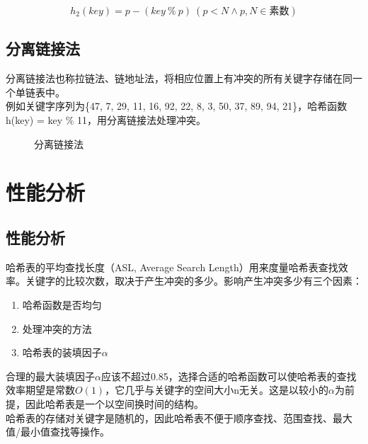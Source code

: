 \vspace{-0.5cm}

$$
	h_2(key) = p - (key\ \%\ p)\ \left(p < N \wedge p, N \in \text{素数}\right)
$$

\vspace{0.5cm}

\subsection{分离链接法}

分离链接法也称拉链法、链地址法，将相应位置上有冲突的所有关键字存储在同一个单链表中。\\

例如关键字序列为\{47, 7, 29, 11, 16, 92, 22, 8, 3, 50, 37, 89, 94, 21\}，哈希函数h(key) = key \% 11，用分离链接法处理冲突。

\begin{figure}[H]
	\centering
	\caption{分离链接法}
\end{figure}

\newpage

\section{性能分析}

\subsection{性能分析}

哈希表的平均查找长度（ASL, Average Search Length）用来度量哈希表查找效率。关键字的比较次数，取决于产生冲突的多少。影响产生冲突多少有三个因素：

\begin{enumerate}
	\item 哈希函数是否均匀
	\item 处理冲突的方法
	\item 哈希表的装填因子$ \alpha $
\end{enumerate}

合理的最大装填因子$ \alpha $应该不超过0.85，选择合适的哈希函数可以使哈希表的查找效率期望是常数$ O(1) $，它几乎与关键字的空间大小n无关。这是以较小的$ \alpha $为前提，因此哈希表是一个以空间换时间的结构。\\

哈希表的存储对关键字是随机的，因此哈希表不便于顺序查找、范围查找、最大值/最小值查找等操作。

\newpage